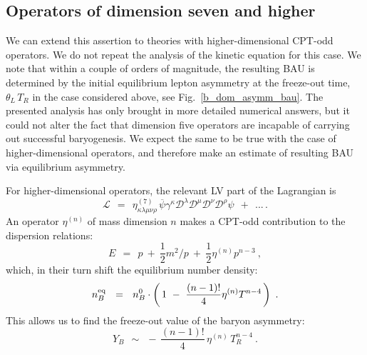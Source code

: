 \documentclass[12pt]{revtex4}
\newcommand{\eq}{{\rm eq}}
\newcommand{\mc}[1]{\mathcal{#1}}
\newcommand{\md}{\mathcal{D}}
\newcommand{\ov}{\overline}
\begin{document}
\subsection{Operators of dimension seven and higher}

	We can extend this assertion to theories with higher-dimensional 
	CPT-odd operators. 
	We do not repeat the analysis of the kinetic equation 
	for this case.
	We note that within a couple of orders of magnitude, the resulting BAU
	is determined by the initial equilibrium lepton asymmetry
	at the freeze-out time, $ \theta_L\,T_R $ in the case considered
	above, see Fig.~\ref{b_dom_asymm_bau}.
	The presented analysis has only brought in more 
	detailed numerical answers, but it could not alter the fact that
	dimension five operators are incapable of carrying out successful
	baryogenesis.
	We expect the same to be true with the case of higher-dimensional
	operators, and therefore make an estimate of resulting BAU 
	via equilibrium asymmetry.


	For higher-dimensional operators, the relevant LV part of the 
	Lagrangian is
\[
	\mc{L} ~~=~~ \eta^{(7)}_{\kappa\lambda\mu\nu\rho}\,
	\ov{\psi} \gamma^\kappa \md^\lambda \md^\mu \md^\nu \md^\rho \psi
	~~+~~ ...\,.
\]
	An operator $ \eta^{(n)} $ of mass dimension $ n $ makes a CPT-odd contribution to
	the dispersion relations:
\begin{equation}
\label{disp_rel_n}
	E ~~=~~ p ~+~ \frac 12 m^2/p ~+~ \frac 12 \eta^{(n)} p^{n-3}~,
\end{equation}
	which, in their turn shift the equilibrium number density:
\[
	n_B^\eq ~~=~~ n_B^0 \cdot \left(\, 1 ~-~ \frac{(n-1)!}{4} \eta^{(n)} T^{n-4}
					\,\right)~.
\]
	This allows us to find the freeze-out value of the baryon asymmetry:
\begin{equation}
\label{Y_B_n}
	Y_B ~~\sim~~ -\, \frac{(n-1)!}{4} \, \eta^{(n)} \,T^{n-4}_R~.
\end{equation}
	
\end{document}

